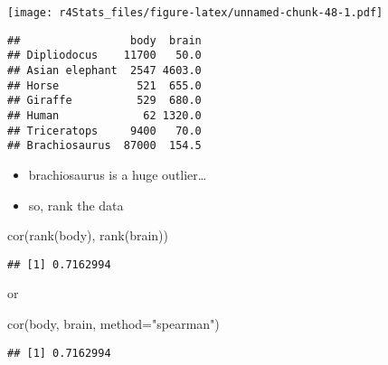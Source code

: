 \documentclass[
]{book}
\newenvironment{Shaded}{\begin{snugshade}}{\end{snugshade}}
\newcommand{\AttributeTok}[1]{\textcolor[rgb]{0.77,0.63,0.00}{#1}}
\newcommand{\DecValTok}[1]{\textcolor[rgb]{0.00,0.00,0.81}{#1}}
\newcommand{\FunctionTok}[1]{\textcolor[rgb]{0.00,0.00,0.00}{#1}}
\newcommand{\NormalTok}[1]{#1}
\newcommand{\OtherTok}[1]{\textcolor[rgb]{0.56,0.35,0.01}{#1}}
\newcommand{\SpecialCharTok}[1]{\textcolor[rgb]{0.00,0.00,0.00}{#1}}
\newcommand{\StringTok}[1]{\textcolor[rgb]{0.31,0.60,0.02}{#1}}
\providecommand{\tightlist}{%
  \setlength{\itemsep}{0pt}\setlength{\parskip}{0pt}}
\theoremstyle{definition}
\theoremstyle{definition}
\theoremstyle{definition}
\theoremstyle{definition}
\theoremstyle{remark}
\begin{document}
\texttt{[image: r4Stats\_files/figure-latex/unnamed-chunk-48-1.pdf]}

\begin{Shaded}
\end{Shaded}

\begin{verbatim}
##                 body  brain
## Dipliodocus    11700   50.0
## Asian elephant  2547 4603.0
## Horse            521  655.0
## Giraffe          529  680.0
## Human             62 1320.0
## Triceratops     9400   70.0
## Brachiosaurus  87000  154.5
\end{verbatim}

\begin{itemize}
\tightlist
\item
  brachiosaurus is a huge outlier\ldots{}
\item
  so, rank the data
\end{itemize}

\begin{Shaded}
\begin{Highlighting}[]
\FunctionTok{cor}\NormalTok{(}\FunctionTok{rank}\NormalTok{(body), }\FunctionTok{rank}\NormalTok{(brain))}
\end{Highlighting}
\end{Shaded}

\begin{verbatim}
## [1] 0.7162994
\end{verbatim}

or

\begin{Shaded}
\begin{Highlighting}[]
\FunctionTok{cor}\NormalTok{(body, brain, }\AttributeTok{method=}\StringTok{"spearman"}\NormalTok{)}
\end{Highlighting}
\end{Shaded}

\begin{verbatim}
## [1] 0.7162994
\end{verbatim}
\end{document}
